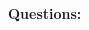 \documentclass{article}
\begin{document}
  \begin{paracol}{2}
    \switchcolumn[0]


    \switchcolumn[1]
    \textbf{Questions:}
    \vspace{65em}

  \end{paracol}
\end{document}
